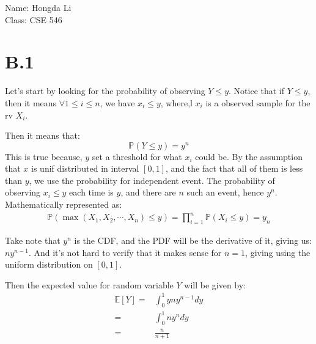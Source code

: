 \documentclass[]{article}
\begin{document}
\hspace{-1.9em}
Name: Hongda Li
\\
Class: CSE 546
\section*{B.1}
    Let's start by looking for the probability of observing $Y \le y$. Notice that if $Y \le y$, then it means $\forall 1 \le i \le n$, we have $x_i \le y$, where,l $x_i$ is a observed sample for the rv $X_i$. 
    \par
    Then it means that: 
    \begin{equation*}\tag{B.1.1}\label{eqn:B.1.1}
        \mathbb{P}\left(Y\le y\right) = 
        y^n
    \end{equation*}
    This is true because, $y$ set a threshold for what $x_i$ could be. By the assumption that $x$ is unif distributed in interval $[0, 1]$, and the fact that all of them is less than $y$, we use the probability for independent event. The probability of observing $x_i \le y$ each time is $y$, and there are $n$ such an event, hence $y^n$. Mathematically represented as: 
    \begin{align*}\tag{B.1.2}\label{eqn:B.1.2}
        \mathbb{P}\left(\max(X_1, X_2, \cdots, X_n) \le y\right)
        =
            \prod_{i = 1}^{n} 
                \mathbb{P}\left(X_i \le y\right)
            = 
            y_n
    \end{align*}
    \par
    Take note that $y^n$ is the CDF, and the PDF will be the derivative of it, giving us: 
    $ny^{n - 1}$. And it's not hard to verify that it makes sense for $n =1$, giving using the uniform distribution on $[0, 1]$. 
    \par
    Then the expected value for random variable $Y$ will be given by: 
    \begin{align*}\tag{B.1.3}\label{eqn:B.1.3}
        \mathbb{E}\left[Y\right] =&
        \int_{0}^{1} y ny^{n - 1}dy
        \\
        =& 
        \int_{0 }^{1} ny^ndy
        \\
        =&
        \frac{n}{n + 1}
    \end{align*}
\end{document}
